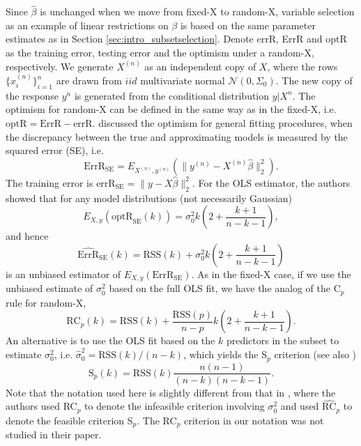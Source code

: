 Since $\hat\beta$ is unchanged when we move from fixed-X to random-X, variable selection as an example of linear restrictions on $\beta$ is based on the same parameter estimates as in Section \ref{sec:intro_subsetselection}. Denote errR, ErrR and optR as the training error, testing error and the optimism under a random-X, respectively. We generate $X^{(n)}$ as an independent copy of $X$, where the rows $\{x_i^{(n)}\}_{i=1}^n$ are drawn from $iid$ multivariate normal $\mathcal{N}(0,\Sigma_0)$. The new copy of the response $y^n$ is generated from the conditional distribution $y|X^n$. The optimism for random-X can be defined in the same way as in the fixed-X, i.e. $\text{optR}=\text{ErrR}-\text{errR}$. \citet{rosset2020fixed} discussed the optimism for general fitting procedures, when the discrepancy between the true and approximating models is measured by the squared error (SE), i.e.
\begin{equation*}
\text{ErrR}_\text{SE} = E_{X^{(n)},y^{(n)}} \left( \lVert y^{(n)} - X^{(n)} \hat\beta \rVert_2^2 \right).
\end{equation*}
The training error is $\text{errR}_\text{SE} = \lVert y - X \hat\beta \rVert_2^2$. For the OLS estimator, the authors showed that for any model distributions (not necessarily Gaussian)
\begin{equation*}
E_{X,y}(\text{optR}_\text{SE}(k)) = \sigma_0^2 k \left(2 + \frac{k+1}{n-k-1} \right),
\end{equation*}
and hence
\begin{equation*}
\widehat{\text{ErrR}}_\text{SE}(k) = \text{RSS}(k) + \sigma_0^2 k \left(2 + \frac{k+1}{n-k-1} \right)
\end{equation*}
is an unbiased estimator of $E_{X,y}(\text{ErrR}_\text{SE})$. As in the fixed-X case, if we use the unbiased estimate of $\sigma_0^2$ based on the full OLS fit, we have the analog of the C$_p$ rule for random-X, 
\begin{equation}
\text{RC}_p(k) = \text{RSS}(k) + \frac{\text{RSS}(p)}{n-p} k\left(2 + \frac{k+1}{n-k-1}\right).
\label{eq:rcp_subsetselection}
\end{equation}
An alternative is to use the OLS fit based on the $k$ predictors in the subset to estimate $\sigma_0^2$, i.e. $\hat\sigma_0^2=\text{RSS}(k)/(n-k)$, which yields the S$_p$ criterion \citep{tukey1967discussion} (see also \citet{hocking1976biometrics,thompson1978a,thompson1978b})
\begin{equation}
\text{S}_p(k) = \text{RSS}(k)\frac{n(n-1)}{(n-k)(n-k-1)}.
\label{eq:sp_subsetselection}
\end{equation}
Note that the notation used here is slightly different from that in \citet{rosset2020fixed}, where the authors used RC$_p$ to denote the infeasible criterion involving $\sigma_0^2$ and used $\widehat{\text{RC}}_p$ to denote the feasible criterion S$_p$. The RC$_p$ criterion in our notation was not studied in their paper. 

